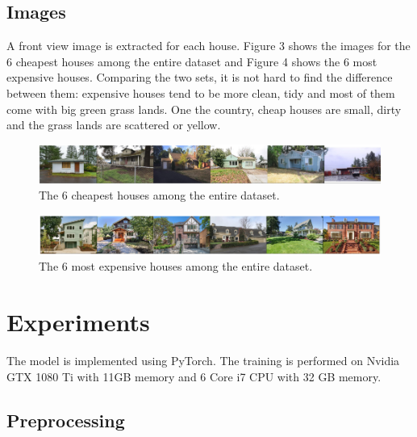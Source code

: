 \documentclass{article} %
\begin{document}
\subsection{Images}

A front view image is extracted for each house.
Figure 3 shows the images for the 6 cheapest houses among the entire dataset
and Figure 4 shows the 6 most expensive houses.
Comparing the two sets, it is not hard to find the difference between them:
expensive houses tend to be more clean, tidy and most of them 
come with big green grass lands.
One the country, cheap houses are small, dirty and
the grass lands are scattered or yellow.

\begin{figure}[h]
	\begin{center}
		\includegraphics[width=1\linewidth]{fig/cheap_img.png}
	\end{center}
	\caption{The 6 cheapest houses among the entire dataset.}
\end{figure}

\begin{figure}[h]
	\begin{center}
		\includegraphics[width=1\linewidth]{fig/exp_img.png}
	\end{center}
	\caption{The 6 most expensive houses among the entire dataset.}
\end{figure}

\section{Experiments}

The model is implemented using PyTorch.
The training is performed on Nvidia GTX 1080 Ti with 11GB memory
and 6 Core i7 CPU with 32 GB memory.

\subsection{Preprocessing}
\end{document}
